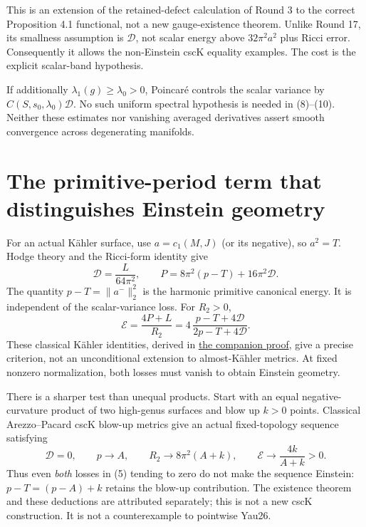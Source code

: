 \documentclass[
  11pt,
]{article}
\begin{document}
This is an extension of the retained-defect calculation of Round 3 to
the correct Proposition 4.1 functional, not a new gauge-existence
theorem. Unlike Round 17, its smallness assumption is \(\mathscr D\),
not scalar energy above \(32\pi^2a^2\) plus Ricci error. Consequently it
allows the non-Einstein cscK equality examples. The cost is the explicit
scalar-band hypothesis.

If additionally \(\lambda_1(g)\ge\lambda_0>0\), Poincaré controls the
scalar variance by \(C(S,s_0,\lambda_0)\mathscr D\). No such uniform
spectral hypothesis is needed in (8)--(10). Neither these estimates nor
vanishing averaged derivatives assert smooth convergence across
degenerating manifolds.

\hypertarget{the-primitive-period-term-that-distinguishes-einstein-geometry}{%
\section{The primitive-period term that distinguishes Einstein
geometry}\label{the-primitive-period-term-that-distinguishes-einstein-geometry}}

For an actual Kähler surface, use \(a=c_1(M,J)\) (or its negative), so
\(a^2=T\). Hodge theory and the Ricci-form identity give \[
\mathscr D=\frac{L}{64\pi^2},\qquad
P=8\pi^2(p-T)+16\pi^2\mathscr D.
\tag{11}
\] The quantity \(p-T=\|a^-\|_2^2\) is the harmonic primitive canonical
energy. It is independent of the scalar-variance loss. For \(R_2>0\), \[
\mathcal E=
\frac{4P+L}{R_2}
=4\,\frac{p-T+4\mathscr D}{2p-T+4\mathscr D}.
\tag{12}
\] These classical Kähler identities, derived in
\href{line1_kahler_energy.md}{the companion proof}, give a precise
criterion, not an unconditional extension to almost-Kähler metrics. At
fixed nonzero normalization, both losses must vanish to obtain Einstein
geometry.

There is a sharper test than unequal products. Start with an equal
negative-curvature product of two high-genus surfaces and blow up
\(k>0\) points. Classical Arezzo--Pacard cscK blow-up metrics give an
actual fixed-topology sequence satisfying \[
\mathscr D=0,\qquad p\longrightarrow A,\qquad
R_2\longrightarrow8\pi^2(A+k),\qquad
\mathcal E\longrightarrow\frac{4k}{A+k}>0.
\tag{13}
\] Thus even \emph{both} losses in (5) tending to zero do not make the
sequence Einstein: \(p-T=(p-A)+k\) retains the blow-up contribution. The
existence theorem and these deductions are attributed separately; this
is not a new cscK construction. It is not a counterexample to pointwise
Yau26.
\end{document}
